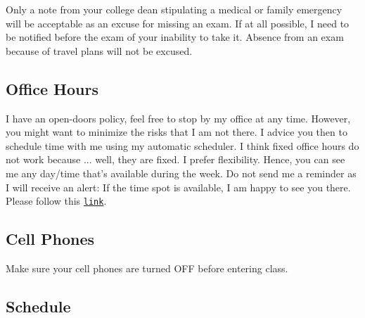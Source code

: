 \documentclass[letterpaper]{article}
\renewenvironment{itemize}{
  \begin{list}{}{
    \setlength{\leftmargin}{1.5em}
  }
}{
  \end{list}
}
\begin{document}
Only a note from your college dean stipulating a medical or family emergency will be acceptable as an excuse for missing an exam. If at all possible, I need to be notified before the exam of your inability to take it. Absence from an exam because of travel plans will not be excused.


\subsection*{Office Hours}

I have an open-doors policy, feel free to stop by my office at any time. However, you might want to minimize the risks that I am not there. I advice you then to schedule time with me using my automatic scheduler. I think fixed office hours do not work because ... well, they are fixed. I prefer flexibility. Hence, you can see me any day/time that's available during the week. Do not send me a reminder as I will receive an alert: If the time spot is available, I am happy to see you there. Please follow this \href{https://calendly.com/bahamonde/officehours}{\texttt{link}}.


\subsection*{Cell Phones} 

Make sure your cell phones are turned OFF before entering class.


%
%
%


\subsection*{Schedule}
\end{document}
